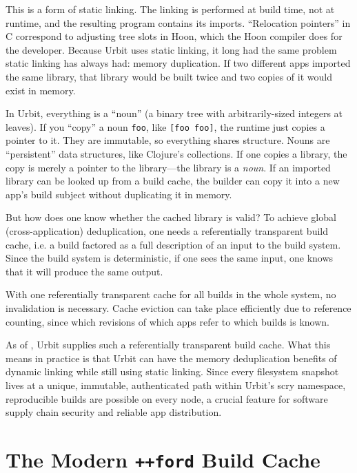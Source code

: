 \documentclass[twoside]{article}
\begin{document}
This is a form of static linking.  The linking is performed at build time, not at runtime, and the resulting program contains its imports.  “Relocation pointers” in C correspond to adjusting tree slots in Hoon, which the Hoon compiler does for the developer.  Because Urbit uses static linking, it long had the same problem static linking has always had:  memory duplication.  If two different apps imported the same library, that library would be built twice and two copies of it would exist in memory.

In Urbit, everything is a “noun” (a binary tree with arbi\-trarily-sized integers at leaves).  If you “copy” a noun \lstinline[style=inlinecode]{foo}, like \lstinline[style=inlinecode]{[foo foo]}, the runtime just copies a pointer to it.  They are immutable, so everything shares structure.  Nouns are “persistent” data structures, like Clojure's collections.  If one copies a library, the copy is merely a pointer to the library—the library is a \emph{noun}.  If an imported library can be looked up from a build cache, the builder can copy it into a new app's build subject without duplicating it in memory.  

But how does one know whether the cached library is valid?  To achieve global (cross-application) deduplication, one needs a referentially transparent build cache, i.e. a build factored as a full description of an input to the build system.  Since the build system is deterministic, if one sees the same input, one knows that it will produce the same output.

With one referentially transparent cache for all builds in the whole system, no invalidation is necessary.  Cache eviction can take place efficiently due to reference counting, since which revisions of which apps refer to which builds is known.

As of , Urbit supplies such a referentially transparent build cache.  What this means in practice is that Urbit can have the memory deduplication benefits of dynamic linking while still using static linking.  Since every filesystem snapshot lives at a unique, immutable, authenticated path within Urbit's scry namespace, reproducible builds are possible on every node, a crucial feature for software supply chain security and reliable app distribution.

\section{The Modern \lstinline[style=inlinecode]{++ford} Build Cache}
\end{document}
